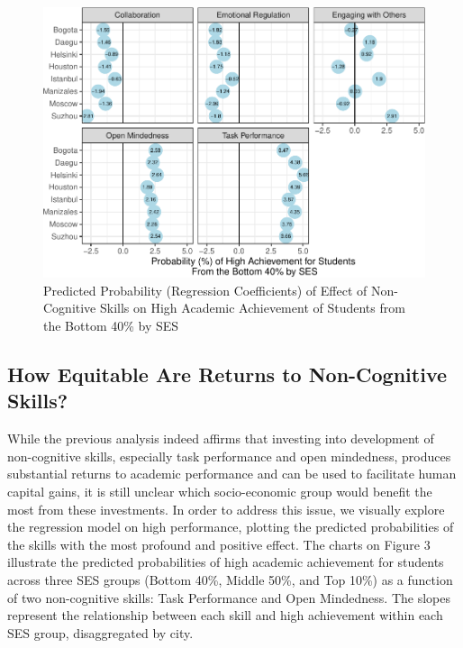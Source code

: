 \documentclass[
  12pt,
  a4paper,
]{article}
\begin{document}
\begin{figure}
\centering
\includegraphics{ncs_and_academic_achievementRmd_files/figure-latex/mlm master chart-1.pdf}
\caption{Predicted Probability (Regression Coefficients) of Effect of
Non-Cognitive Skills on High Academic Achievement of Students from the
Bottom 40\% by SES}
\end{figure}

\hypertarget{how-equitable-are-returns-to-non-cognitive-skills}{%
\subsection{How Equitable Are Returns to Non-Cognitive
Skills?}\label{how-equitable-are-returns-to-non-cognitive-skills}}

While the previous analysis indeed affirms that investing into
development of non-cognitive skills, especially task performance and
open mindedness, produces substantial returns to academic performance
and can be used to facilitate human capital gains, it is still unclear
which socio-economic group would benefit the most from these
investments. In order to address this issue, we visually explore the
regression model on high performance, plotting the predicted
probabilities of the skills with the most profound and positive effect.
The charts on Figure 3 illustrate the predicted probabilities of high
academic achievement for students across three SES groups (Bottom 40\%,
Middle 50\%, and Top 10\%) as a function of two non-cognitive skills:
Task Performance and Open Mindedness. The slopes represent the
relationship between each skill and high achievement within each SES
group, disaggregated by city.
\end{document}
